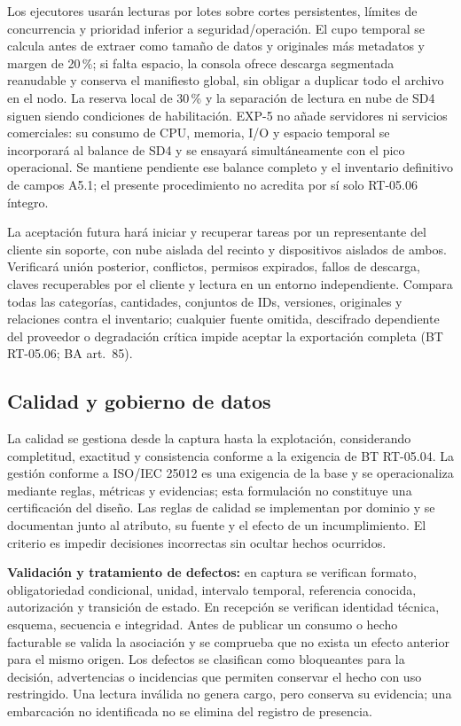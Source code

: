 Los ejecutores usarán lecturas por lotes sobre cortes persistentes, límites de concurrencia y prioridad inferior a seguridad/operación. El cupo temporal se calcula antes de extraer como tamaño de datos y originales más metadatos y margen de 20\,\%; si falta espacio, la consola ofrece descarga segmentada reanudable y conserva el manifiesto global, sin obligar a duplicar todo el archivo en el nodo. La reserva local de 30\,\% y la separación de lectura en nube de SD4 siguen siendo condiciones de habilitación. EXP-5 no añade servidores ni servicios comerciales: su consumo de CPU, memoria, I/O y espacio temporal se incorporará al balance de SD4 y se ensayará simultáneamente con el pico operacional. Se mantiene pendiente ese balance completo y el inventario definitivo de campos A5.1; el presente procedimiento no acredita por sí solo RT-05.06 íntegro.

La aceptación futura hará iniciar y recuperar tareas por un representante del cliente sin soporte, con nube aislada del recinto y dispositivos aislados de ambos. Verificará unión posterior, conflictos, permisos expirados, fallos de descarga, claves recuperables por el cliente y lectura en un entorno independiente. Compara todas las categorías, cantidades, conjuntos de IDs, versiones, originales y relaciones contra el inventario; cualquier fuente omitida, descifrado dependiente del proveedor o degradación crítica impide aceptar la exportación completa (BT RT-05.06; BA art.~85).

\subsection{Calidad y gobierno de datos}
\label{subsec:sd5_calidad}

La calidad se gestiona desde la captura hasta la explotación, considerando completitud, exactitud y consistencia conforme a la exigencia de BT RT-05.04. La gestión conforme a ISO/IEC 25012 es una exigencia de la base y se operacionaliza mediante reglas, métricas y evidencias; esta formulación no constituye una certificación del diseño. Las reglas de calidad se implementan por dominio y se documentan junto al atributo, su fuente y el efecto de un incumplimiento. El criterio es impedir decisiones incorrectas sin ocultar hechos ocurridos.

\textbf{Validación y tratamiento de defectos:} en captura se verifican formato, obligatoriedad condicional, unidad, intervalo temporal, referencia conocida, autorización y transición de estado. En recepción se verifican identidad técnica, esquema, secuencia e integridad. Antes de publicar un consumo o hecho facturable se valida la asociación y se comprueba que no exista un efecto anterior para el mismo origen. Los defectos se clasifican como bloqueantes para la decisión, advertencias o incidencias que permiten conservar el hecho con uso restringido. Una lectura inválida no genera cargo, pero conserva su evidencia; una embarcación no identificada no se elimina del registro de presencia.

